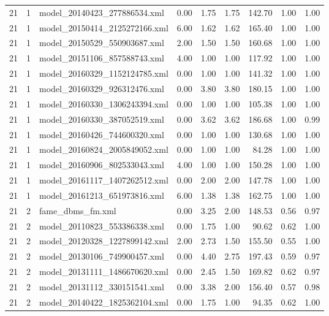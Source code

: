 \begin{table}[ht]
\begin{tabular}{rrlrrrrrr}
   21 &   1 & model\_20140423\_277886534.xml & 0.00 & 1.75 & 1.75 & 142.70 & 1.00 & 1.00 \\ 
   21 &   1 & model\_20150414\_2125272166.xml & 6.00 & 1.62 & 1.62 & 165.40 & 1.00 & 1.00 \\ 
   21 &   1 & model\_20150529\_550903687.xml & 2.00 & 1.50 & 1.50 & 160.68 & 1.00 & 1.00 \\ 
   21 &   1 & model\_20151106\_857588743.xml & 4.00 & 1.00 & 1.00 & 117.92 & 1.00 & 1.00 \\ 
   21 &   1 & model\_20160329\_1152124785.xml & 0.00 & 1.00 & 1.00 & 141.32 & 1.00 & 1.00 \\ 
   21 &   1 & model\_20160329\_926312476.xml & 0.00 & 3.80 & 3.80 & 180.15 & 1.00 & 1.00 \\ 
   21 &   1 & model\_20160330\_1306243394.xml & 0.00 & 1.00 & 1.00 & 105.38 & 1.00 & 1.00 \\ 
   21 &   1 & model\_20160330\_387052519.xml & 0.00 & 3.62 & 3.62 & 186.68 & 1.00 & 0.99 \\ 
   21 &   1 & model\_20160426\_744600320.xml & 0.00 & 1.00 & 1.00 & 130.68 & 1.00 & 1.00 \\ 
   21 &   1 & model\_20160824\_2005849052.xml & 0.00 & 1.00 & 1.00 & 84.28 & 1.00 & 1.00 \\ 
   21 &   1 & model\_20160906\_802533043.xml & 4.00 & 1.00 & 1.00 & 150.28 & 1.00 & 1.00 \\ 
   21 &   1 & model\_20161117\_1407262512.xml & 0.00 & 2.00 & 2.00 & 147.78 & 1.00 & 1.00 \\ 
   21 &   1 & model\_20161213\_651973816.xml & 6.00 & 1.38 & 1.38 & 162.75 & 1.00 & 1.00 \\ 
   21 &   2 & fame\_dbms\_fm.xml & 0.00 & 3.25 & 2.00 & 148.53 & 0.56 & 0.97 \\ 
   21 &   2 & model\_20110823\_553386338.xml & 0.00 & 1.75 & 1.00 & 90.62 & 0.62 & 1.00 \\ 
   21 &   2 & model\_20120328\_1227899142.xml & 2.00 & 2.73 & 1.50 & 155.50 & 0.55 & 1.00 \\ 
   21 &   2 & model\_20130106\_749900457.xml & 0.00 & 4.40 & 2.75 & 197.43 & 0.59 & 0.97 \\ 
   21 &   2 & model\_20131111\_1486670620.xml & 0.00 & 2.45 & 1.50 & 169.82 & 0.62 & 0.97 \\ 
   21 &   2 & model\_20131112\_330151541.xml & 0.00 & 3.38 & 2.00 & 156.40 & 0.57 & 0.98 \\ 
   21 &   2 & model\_20140422\_1825362104.xml & 0.00 & 1.75 & 1.00 & 94.35 & 0.62 & 1.00 \\ 

\end{tabular}
\end{table}
